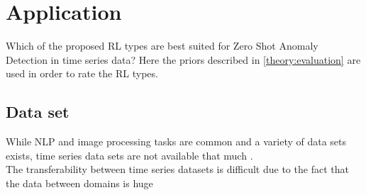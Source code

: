 \chapter{Application}\label{application}
 Which of the proposed RL types are best suited for Zero Shot Anomaly Detection in time series data?
Here the priors described in \ref{theory:evaluation} are used in order to rate the RL types.
\section{Data set}
While NLP and image processing tasks are common and a variety of data sets exists, time series data sets are not available that much \cite{ma_survey_2023}. \\
The transferability between time series datasets is difficult due to the fact that the data between domains is huge \cite{ma_survey_2023}

